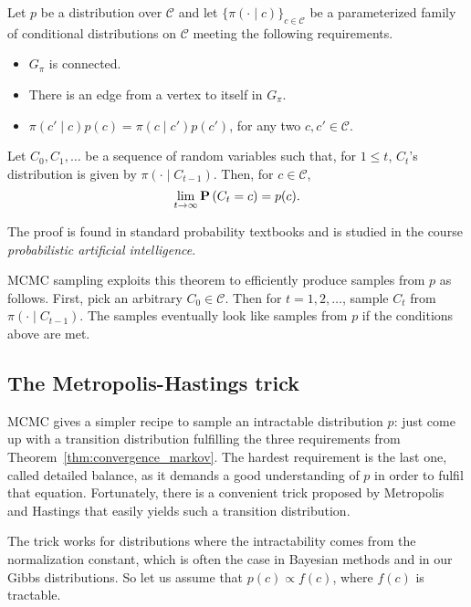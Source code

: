 \begin{theorem}
Let $p$ be a distribution over $\mathcal{C}$ and let $\{\pi(\cdot \mid c)\}_{c \in \mathcal{C}}$ be a parameterized
family of conditional distributions on $\mathcal{C}$ meeting the following
requirements.

\begin{itemize}
\item $G_\pi$ is connected.
\item There is an edge from a vertex to itself in $G_\pi$.
\item $\pi(c' \mid c)p(c) = \pi(c \mid c')p(c')$, for any two $c, c' \in \mathcal{C}$.
\end{itemize}

Let $C_0, C_1, \ldots$ be a sequence of random variables such that, for $1 \leq t$,
$C_t$'s distribution is given by $\pi(\cdot \mid C_{t-1})$. Then, for $c \in \mathcal{C}$,
%
\begin{equation}
\lim_{t \to \infty} \mathbf{P}\left(C_t = c\right) = p(c).
\end{equation}
%
\label{thm:convergence_markov}
\end{theorem}

The proof is found in standard probability textbooks and is studied in
the course \emph{probabilistic artificial intelligence}.

MCMC sampling exploits this theorem to efficiently produce samples from $p$ as follows. 
First, pick an arbitrary $C_0 \in \mathcal{C}$. Then for $t = 1, 2, \ldots$, sample $C_t$ from $\pi\left(\cdot \mid C_{t-1}\right)$. The samples eventually look like samples from $p$ if the conditions
above are met.

\subsection{The Metropolis-Hastings trick}

MCMC gives a simpler recipe to sample an intractable distribution $p$: just
come up with a transition distribution fulfilling the three requirements
from Theorem~\ref{thm:convergence_markov}. The hardest requirement is the last one, called detailed
balance, as it demands a good understanding of $p$ in order to fulfil that
equation. Fortunately, there is a convenient trick proposed by Metropolis
and Hastings that easily yields such a transition distribution.

The trick works for distributions where the intractability comes from
the normalization constant, which is often the case in Bayesian methods
and in our Gibbs distributions. So let us assume that $p(c) \propto f(c)$, where
$f(c)$ is tractable.

